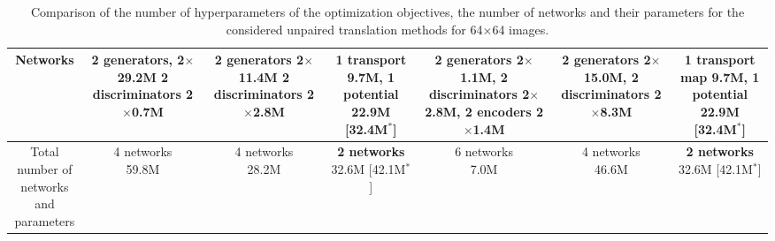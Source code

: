 \documentclass{article} %
\begin{document}
\begin{table}[!h]
\begin{tabular}{|c|c|c|c|c|c|c|}
Networks & \makecell{2 generators, \\ 2$\times$29.2M\\ \\ 2 discriminators \\ 2$\times$0.7M}  & \makecell{2 generators \\ 2$\times$11.4M \\ \\ 2 discriminators \\ 2$\times$2.8M} & \makecell{1 transport \\ 9.7M, \\ \\ 1 potential \\ 22.9M [32.4M$^{*}$]} & \makecell{2 generators \\ 2$\times$1.1M, \\ \\ 2 discriminators \\ 2$\times$2.8M, \\ \\ 2  encoders \\ 2$\times$1.4M} & \makecell{2  generators \\ 2$\times$15.0M, \\ \\ 2 discriminators \\ 2$\times$8.3M} & \makecell{1 transport map \\ 9.7M, \\ \\ 1 potential \\ 22.9M [32.4M$^{*}$]}  \\
\midrule
\makecell{Total number of \\networks and \\parameters} & \makecell{4 networks\\59.8M}  & \makecell{4 networks\\28.2M} & \makecell{\textbf{2 networks}\\32.6M [42.1M$^{*}$]} & \makecell{6 networks\\7.0M} & \makecell{4 networks\\46.6M} & \makecell{\textbf{2 networks}\\32.6M [42.1M$^{*}$]} \\
\bottomrule
\end{tabular}
\caption{\centering Comparison of the number of hyperparameters of the optimization objectives, the number of networks and their parameters for the considered unpaired translation methods for 64$\times$64 images.}\label{table-methods-hyperparameters}
\end{table}
\end{document}
